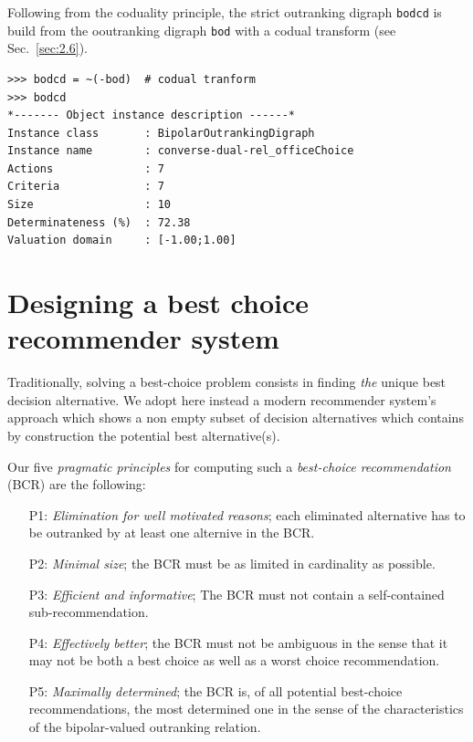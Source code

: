 Following from the coduality principle, the strict outranking digraph \texttt{bodcd} is build from the ooutranking digraph \texttt{bod} with a codual transform (see Sec.~\ref{sec:2.6}).
\begin{lstlisting} 
>>> bodcd = ~(-bod)  # codual tranform
>>> bodcd
*------- Object instance description ------*
Instance class       : BipolarOutrankingDigraph
Instance name        : converse-dual-rel_officeChoice
Actions              : 7
Criteria             : 7
Size                 : 10
Determinateness (%)  : 72.38
Valuation domain     : [-1.00;1.00]
\end{lstlisting}


\section{Designing a best choice recommender system}
\label{sec:4.4}

Traditionally, solving a best-choice problem consists in finding \emph{the} unique best decision alternative. We adopt here instead a modern recommender system’s approach which shows a non empty subset of decision alternatives which contains by construction the potential best alternative(s).

Our five \emph{pragmatic principles} for computing such a \emph{best-choice recommendation} (BCR) are the following:
\begin{itemize}[leftmargin=1cm,listparindent=0em]
\item [P1:] \emph{Elimination for well motivated reasons}; each eliminated alternative has to be outranked by at least one alternive in the BCR.
\item [P2:] \emph{Minimal size}; the BCR must be as limited in cardinality as possible.
\item [P3:] \emph{Efficient and informative}; The BCR must not contain a self-contained sub-recommendation.
\item [P4:] \emph{Effectively better}; the BCR must not be ambiguous in the sense that it may not be both a best choice as well as a worst choice recommendation.
\item [P5:] \emph{Maximally determined}; the BCR is, of all potential best-choice recommendations, the most determined one in the sense of the characteristics of the bipolar-valued outranking relation.
\end{itemize}

